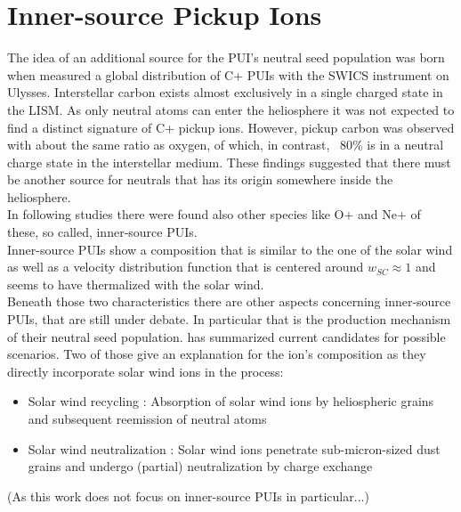 \section{Inner-source Pickup Ions}
The idea of an additional source for the PUI's neutral seed population was born when \citet{geiss_1995a} measured a global distribution of C+ PUIs with the SWICS instrument on Ulysses. 
Interstellar carbon exists almost exclusively in a single charged state \citep{Frisch} in the LISM. As only neutral atoms can enter the heliosphere it was not expected to find a distinct signature of C+ pickup ions.
However, pickup carbon was observed with about the same ratio as oxygen, of which, in contrast, ~80\% is in a neutral charge state in the interstellar medium.
These findings suggested that there must be another source for neutrals that has its origin somewhere inside the heliosphere. \\
In following studies \citep[e.g.][]{geiss_1995b} there were found also other species like O+ and Ne+ of these, so called, inner-source PUIs.
\\
Inner-source PUIs show a composition that is similar to the one of the solar wind \citep{gloeckler2000_innersource, allegrini_2005} as well as a velocity distribution function that is centered around $w_{SC} \approx 1$ \citep{schwadron_2000} and seems to have thermalized with the solar wind.
\\
Beneath those two characteristics there are other aspects concerning inner-source PUIs, that are still under debate. In particular that is the production mechanism of their neutral seed population.
\citet{allegrini_2005} has summarized current candidates for possible scenarios. Two of those give an explanation for the ion's composition as they directly incorporate solar wind ions in the process:
\begin{itemize}
	\item Solar wind recycling \citep{gloeckler2000_innersource, schwadron_2000}: Absorption of solar wind ions by heliospheric grains and subsequent reemission of neutral atoms
	\item Solar wind neutralization \citep{wimmer_2002}: Solar wind ions penetrate sub-micron-sized dust grains and undergo (partial) neutralization by charge exchange
\end{itemize}
(As this work does not focus on inner-source PUIs in particular...)


